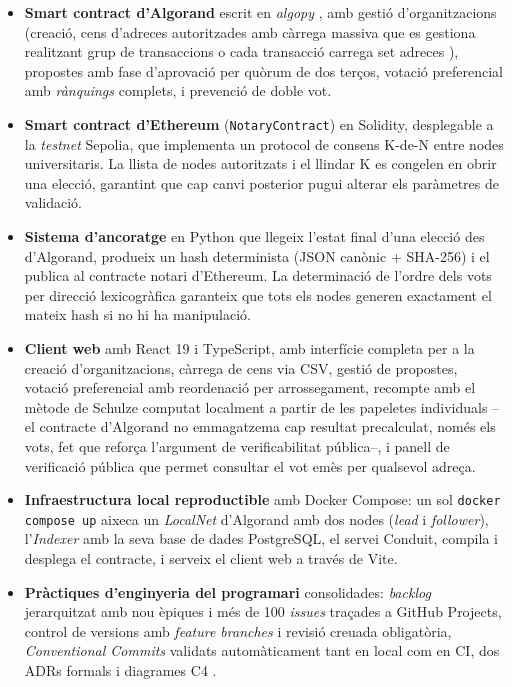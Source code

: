 \begin{itemize}
    \item \textbf{Smart contract d'Algorand} escrit en \emph{algopy}
    \cite{algorandfoundation2024puya}, amb gestió d'organitzacions
    (creació, cens d'adreces autoritzades amb càrrega massiva que es 
    gestiona realitzant grup de transaccions o cada transacció carrega
    set adreces ), propostes amb fase d'aprovació per
    quòrum de dos terços, votació preferencial amb \emph{rànquings}
    complets, i prevenció de doble vot.

    \item \textbf{Smart contract d'Ethereum} (\texttt{NotaryContract})
    en Solidity, desplegable a la \emph{testnet} Sepolia, que
    implementa un protocol de consens K-de-N entre nodes
    universitaris. La llista de nodes autoritzats i el llindar K es
    congelen en obrir una elecció, garantint que cap canvi posterior
    pugui alterar els paràmetres de validació.

    \item \textbf{Sistema d'ancoratge} en Python que llegeix l'estat
    final d'una elecció des d'Algorand, produeix un hash determinista
    (JSON canònic + SHA-256) i el publica al contracte notari
    d'Ethereum. La determinació de l'ordre dels vots per direcció
    lexicogràfica garanteix que tots els nodes generen exactament el
    mateix hash si no hi ha manipulació.

    \item \textbf{Client web} amb React 19 i TypeScript, amb interfície
    completa per a la creació d'organitzacions, càrrega de cens via
    \ac{CSV}, gestió de propostes, votació preferencial amb
    reordenació per arrossegament, recompte amb el mètode de Schulze
    \cite{schulze2011newmethod} computat localment a partir de les
    papeletes individuals --el contracte d'Algorand no emmagatzema cap
    resultat precalculat, només els vots, fet que reforça l'argument
    de verificabilitat pública--, i panell de verificació pública que
    permet consultar el vot emès per qualsevol adreça.

    \item \textbf{Infraestructura local reproductible} amb Docker
    Compose: un sol \texttt{docker compose up} aixeca un \emph{LocalNet}
    d'Algorand amb dos nodes (\emph{lead} i \emph{follower}),
    l'\emph{Indexer} amb la seva base de dades PostgreSQL, el servei
    Conduit, compila i desplega el contracte, i serveix el client web a
    través de Vite.

    \item \textbf{Pràctiques d'enginyeria del programari}
    consolidades: \emph{backlog} jerarquitzat amb nou èpiques i més de
    100 \emph{issues} traçades a GitHub Projects, control de versions
    amb \emph{feature branches} i revisió creuada obligatòria,
    \emph{Conventional Commits} \cite{conventionalcommits} validats
    automàticament tant en local com en CI, dos \aclp{ADR} formals i
    diagrames C4 \cite{brown2018c4}.
\end{itemize}

